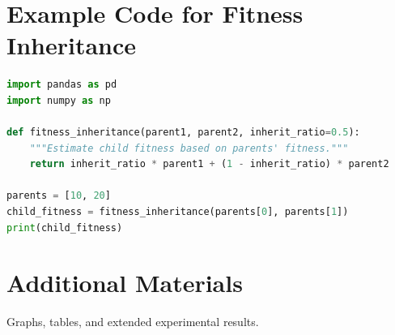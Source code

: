 \documentclass[12pt,a4paper]{report}
\begin{document}
\section{Example Code for Fitness Inheritance}
\label{sec:example-code}
\begin{lstlisting}[language=Python]
import pandas as pd
import numpy as np

def fitness_inheritance(parent1, parent2, inherit_ratio=0.5):
    """Estimate child fitness based on parents' fitness."""
    return inherit_ratio * parent1 + (1 - inherit_ratio) * parent2

parents = [10, 20]
child_fitness = fitness_inheritance(parents[0], parents[1])
print(child_fitness)
\end{lstlisting}

\section{Additional Materials}
\label{sec:additional-materials}
Graphs, tables, and extended experimental results.
\end{document}
